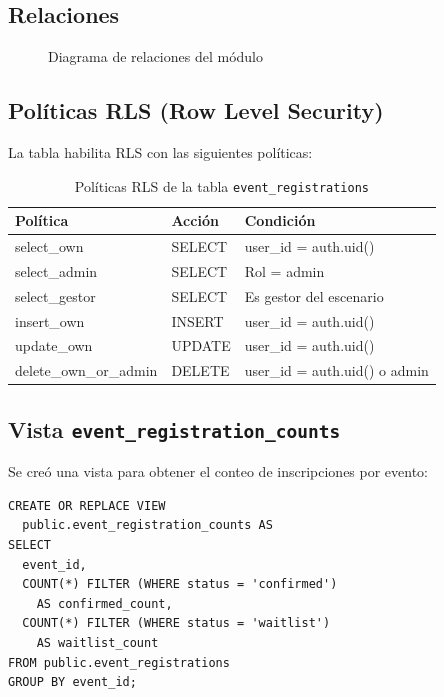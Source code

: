 \subsection{Relaciones}

\begin{figure}[H]
\centering
{}
\caption{Diagrama de relaciones del m\'odulo}
\end{figure}

\subsection{Pol\'iticas RLS (Row Level Security)}

La tabla habilita RLS con las siguientes pol\'iticas:

\begin{table}[H]
\centering
\small
\begin{tabular}{@{}lp{4.5cm}p{4.5cm}@{}}
\toprule
\textbf{Pol\'itica} & \textbf{Acci\'on} & \textbf{Condici\'on} \\
\midrule
select\_own & SELECT & user\_id = auth.uid() \\
select\_admin & SELECT & Rol = admin \\
select\_gestor & SELECT & Es gestor del escenario \\
insert\_own & INSERT & user\_id = auth.uid() \\
update\_own & UPDATE & user\_id = auth.uid() \\
delete\_own\_or\_admin & DELETE & user\_id = auth.uid() o admin \\
\bottomrule
\end{tabular}
\caption{Pol\'iticas RLS de la tabla \texttt{event\_registrations}}
\end{table}

\subsection{Vista \texttt{event\_registration\_counts}}

Se cre\'o una vista para obtener el conteo de inscripciones por evento:

\begin{verbatim}
CREATE OR REPLACE VIEW
  public.event_registration_counts AS
SELECT
  event_id,
  COUNT(*) FILTER (WHERE status = 'confirmed')
    AS confirmed_count,
  COUNT(*) FILTER (WHERE status = 'waitlist')
    AS waitlist_count
FROM public.event_registrations
GROUP BY event_id;
\end{verbatim}
